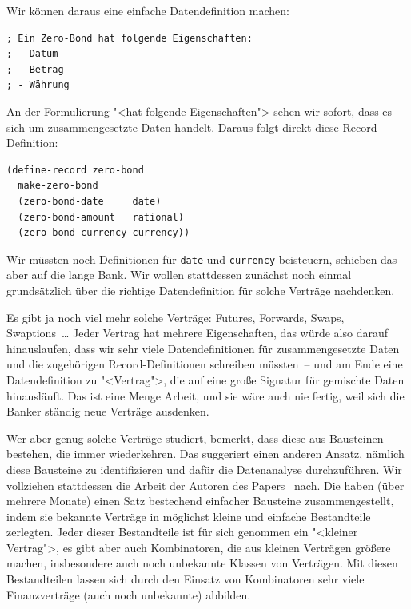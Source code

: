 Wir können daraus eine einfache Datendefinition machen:
%
\begin{lstlisting}
; Ein Zero-Bond hat folgende Eigenschaften:
; - Datum
; - Betrag
; - Währung
\end{lstlisting}
%
An der Formulierung "<hat folgende Eigenschaften"> sehen wir sofort,
dass es sich um zusammengesetzte Daten handelt.  Daraus folgt direkt
diese Record-Definition:
%
\begin{lstlisting}
(define-record zero-bond
  make-zero-bond
  (zero-bond-date     date)
  (zero-bond-amount   rational)
  (zero-bond-currency currency))
\end{lstlisting}
%
Wir müssten noch Definitionen für \texttt{date} und \texttt{currency}
beisteuern, schieben das aber auf die lange Bank.  Wir wollen
stattdessen zunächst noch einmal grundsätzlich über die richtige
Datendefinition für solche Verträge nachdenken.

Es gibt ja noch viel mehr solche Verträge: Futures, Forwards, Swaps,
Swaptions~\ldots{} Jeder Vertrag hat mehrere Eigenschaften, das würde
also darauf hinauslaufen, dass wir sehr viele Datendefinitionen für
zusammengesetzte Daten und die zugehörigen Record-Definitionen
schreiben müssten~-- und am Ende eine Datendefinition zu "<Vertrag">,
die auf eine große Signatur für gemischte Daten hinausläuft.  Das ist
eine Menge Arbeit, und sie wäre auch nie fertig, weil sich die Banker
ständig neue Verträge ausdenken.

Wer aber genug solche Verträge studiert, bemerkt, dass diese aus
Bausteinen bestehen, die immer wiederkehren.  Das suggeriert einen
anderen Ansatz, nämlich diese Bausteine zu identifizieren und dafür
die Datenanalyse durchzuführen.  Wir vollziehen stattdessen die
Arbeit der Autoren des Papers~\cite{FinancialContracts} nach.  Die haben
(über mehrere Monate) einen Satz bestechend einfacher Bausteine
zusammengestellt, indem sie bekannte Verträge in möglichst kleine und
einfache Bestandteile zerlegten.  Jeder dieser Bestandteile ist für
sich genommen ein "<kleiner Vertrag">, es gibt aber auch Kombinatoren,
die aus kleinen Verträgen größere machen, insbesondere auch noch
unbekannte Klassen von Verträgen.  Mit diesen Bestandteilen lassen sich
durch den Einsatz von Kombinatoren sehr viele Finanzverträge (auch
noch unbekannte) abbilden.

